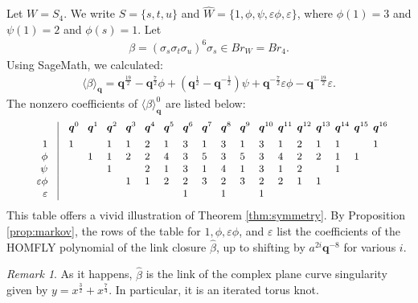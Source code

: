 \documentclass[a4paper,10pt,leqno]{amsart}
\theoremstyle{plain}
\theoremstyle{plain}
\theoremstyle{plain}
\theoremstyle{definition}
\theoremstyle{remark}
\newtheorem{rem}[thm]{Remark}
\newcommand{\Br}{\mathit{Br}}
\newcommand{\Q}{\bm{q}}
\newcommand{\Tr}[1]{\langle{#1}\rangle_{\Q}}
\begin{document}
Let $W = S_4$.
We write $S = \{s, t, u\}$ and $\hat{W} = \{1, \phi, \psi, \varepsilon\phi, \varepsilon\}$, where $\phi(1) = 3$ and $\psi(1) = 2$ and $\phi(s) = 1$.
Let
\begin{align}
\beta = (\sigma_s\sigma_t\sigma_u)^6\sigma_s \in \Br_W = \Br_4.
\end{align}
Using SageMath, we calculated:
\begin{align}
\Tr{\beta} 
= \Q^{\frac{19}{2}} 
- \Q^{\frac{7}{2}} \phi 
+ (\Q^{\frac{1}{2}} 
- \Q^{-\frac{1}{2}})\psi
+ \Q^{-\frac{7}{2}} \varepsilon\phi
- \Q^{-\frac{19}{2}}\varepsilon.
\end{align}
The nonzero coefficients of $\Tr{\beta}^0$ are listed below:
\begin{align}\label{eq:zariski}
\small
\begin{array}{r@{\quad}|@{\quad}p{0.75em}p{0.75em}p{0.75em}p{0.75em}p{0.75em}p{0.75em}p{0.75em}p{0.75em}p{0.75em}p{0.75em}p{0.75em}p{0.75em}p{0.75em}p{0.75em}p{0.75em}p{0.75em}p{0.75em}}	&$\Q^0$
&$\Q^1$
&$\Q^2$
&$\Q^3$
&$\Q^4$
&$\Q^5$
&$\Q^6$
&$\Q^7$
&$\Q^8$
&$\Q^9$
&$\Q^{10}$
&$\Q^{11}$
&$\Q^{12}$
&$\Q^{13}$
&$\Q^{14}$
&$\Q^{15}$
&$\Q^{16}$\\[1ex]
1					&1& &1&1&2&1&3&1&3&1&3&1&2&1&1& &1\\
\phi				& &1&1&2&2&4&3&5&3&5&3&4&2&2&1&1&\\
\psi				& & &1& &2&1&3&1&4&1&3&1&2& &1& &\\
\varepsilon\phi	& & & &1&1&2&2&3&2&3&2&2&1&1& & &\\
\varepsilon		& & & & & & &1& &1& &1& & & & & &
\end{array}
\end{align}
This table offers a vivid illustration of Theorem \ref{thm:symmetry}.
By Proposition \ref{prop:markov}, the rows of the table for $1, \phi, \varepsilon\phi$, and $\varepsilon$ list the coefficients of the HOMFLY polynomial of the link closure $\hat{\beta}$, up to shifting by $a^{2i}\Q^{-8}$ for various $i$.

\begin{rem}
As it happens, $\hat{\beta}$ is the link of the complex plane curve singularity given by $y = x^{\frac{3}{2}} + x^{\frac{7}{4}}$.
In particular, it is an iterated torus knot.
\end{rem}
\end{document}
